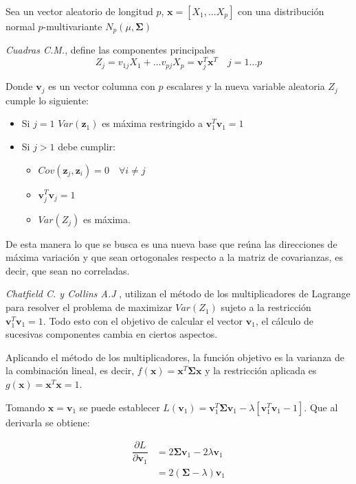 \noindent Sea un vector aleatorio de longitud $p$, $\mathbf{x}=[X_1,\ldots X_p]$ con una distribución normal $p$-multivariante $N_p(\mu,\mathbf{\Sigma})$
\begin{defi}
\emph{Cuadras C.M.},\cite{Cuadras 2014} define las componentes principales 
\begin{equation}
Z_j=v_{1j}X_1+\ldots v_{pj}X_p=\mathbf{v}_j^T\mathbf{x}^T \quad j=1\ldots p
\end{equation}

\noindent Donde $\textbf{v}_j$ es un vector columna con $p$ escalares y la nueva variable aleatoria $Z_j$ cumple lo siguiente:
\begin{itemize}
\item Si $j=1$ $Var(\mathbf{z}_1)$ es máxima restringido a $\mathbf{v}_1^T \mathbf{v}_1=1$
\item Si $j>1$ debe cumplir:
\begin{itemize}
\item $Cov(\textbf{z}_j,\textbf{z}_i)=0\quad \forall i\neq j $
\item $\textbf{v}_j^T \textbf{v}_j=1$
\item $Var(Z_j)$ es máxima. 
\end{itemize}
\end{itemize}
\noindent De esta manera lo que se busca es una nueva base que reúna las direcciones de máxima variación y que sean ortogonales respecto a la matriz de covarianzas, es decir, que sean no correladas.
\end{defi}

\noindent \emph{Chatfield C. y Collins A.J} \cite{Chatfield 1989}, utilizan el método de los multiplicadores de Lagrange para resolver el problema de maximizar  $Var(Z_1)$ sujeto a la restricción $\textbf{v}_1^T\textbf{v}_1=1$. Todo esto con el objetivo de calcular el vector $\mathbf{v}_1$, el cálculo de sucesivas componentes cambia en ciertos aspectos. 

\noindent Aplicando el método de los multiplicadores, la función objetivo es la varianza de la combinación lineal, es decir, $f(\mathbf{x})=\mathbf{x}^T \mathbf{\Sigma} \mathbf{x}$ y la restricción aplicada es $g(\textbf{x})=\textbf{x}^T\textbf{x}=1$. 

\noindent Tomando $\textbf{x}=\textbf{v}_1$ se puede establecer $L(\textbf{v}_1)=\textbf{v}_1^T \mathbf{\Sigma} \textbf{v}_1 - \lambda[\textbf{v}_1^T \textbf{v}_1-1]$. Que al derivarla se obtiene:

\begin{align*}
\dfrac{\partial L}{\partial \textbf{v}_1} &= 2\mathbf{\Sigma} \textbf{v}_1 - 2\lambda\textbf{v}_1\\
& = 2(\mathbf{\Sigma}-\lambda)\textbf{v}_1 
\end{align*}

